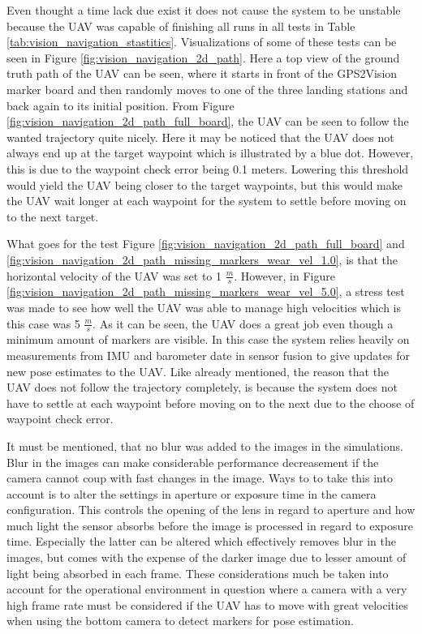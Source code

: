 \documentclass[../Head/report.tex]{subfiles}
\begin{document}
Even thought a time lack due exist it does not cause the system to be unstable because the UAV was capable of finishing all runs in all tests in Table \ref{tab:vision_navigation_stastitics}. Visualizations of some of these tests can be seen in Figure \ref{fig:vision_navigation_2d_path}. Here a top view of the ground truth path of the UAV can be seen, where it starts in front of the GPS2Vision marker board and then randomly moves to one of the three landing stations and back again to its initial position. From Figure \ref{fig:vision_navigation_2d_path_full_board}, the UAV can be seen to follow the wanted trajectory quite nicely. Here it may be noticed that the UAV does not always end up at the target waypoint which is illustrated by a blue dot. However, this is due to the waypoint check error being 0.1 meters. Lowering this threshold would yield the UAV being closer to the target waypoints, but this would make the UAV wait longer at each waypoint for the system to settle before moving on to the next target. 

What goes for the test Figure \ref{fig:vision_navigation_2d_path_full_board} and \ref{fig:vision_navigation_2d_path_missing_markers_wear_vel_1.0}, is that the horizontal velocity of the UAV was set to 1 $\frac{m}{s}$. However, in Figure \ref{fig:vision_navigation_2d_path_missing_markers_wear_vel_5.0}, a stress test was made to see how well the UAV was able to manage high velocities which is this case was 5 $\frac{m}{s}$. As it can be seen, the UAV does a great job even though a minimum amount of markers are visible. In this case the system relies heavily on measurements from IMU and barometer date in sensor fusion to give updates for new pose estimates to the UAV. Like already mentioned, the reason that the UAV does not follow the trajectory completely, is because the system does not have to settle at each waypoint before moving on to the next due to the choose of waypoint check error. 

It must be mentioned, that no blur was added to the images in the simulations. Blur in the images can make considerable performance decreasement if the camera cannot coup with fast changes in the image. Ways to to take this into account is to alter the settings in aperture or exposure time in the camera configuration. This controls the opening of the lens in regard to aperture and how much light the sensor absorbs before the image is processed in regard to exposure time. Especially the latter can be altered which effectively removes blur in the images, but comes with the expense of the darker image due to lesser amount of light being absorbed in each frame. These considerations much be taken into account for the operational environment in question where a camera with a very high frame rate must be considered if the UAV has to move with great velocities when using the bottom camera to detect markers for pose estimation. 
\end{document}
